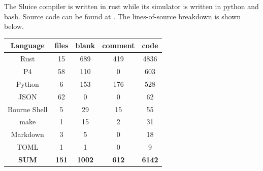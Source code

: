 \documentclass[12pt, oneside]{article}
\begin{document}
The Sluice compiler is written in rust while its simulator is written in python and bash. Source code can be found at \cite{sluiceSrc}. The lines-of-source breakdown is shown below.

\begin{center}
 \begin{tabular} {|c c c c c|} 
 \hline
 Language &  files & blank & comment & code  \\ [0.5ex] 
  \hline\hline
Rust &	15  & 689 & 419 &  4836\\
 \hline\hline
P4&	58 & 110 & 0 & 603 \\
 \hline
Python& 6 & 153 & 176 & 528 \\
 \hline
JSON&	62 & 0 & 0 & 62 \\
 \hline
Bourne Shell&	5 & 29 & 15 & 55 \\
 \hline
make & 1 & 15 & 2 & 31 \\
 \hline
Markdown & 3 & 5 & 0 & 18 \\
 \hline
TOML & 1 & 1 & 0 & 9 \\
 \hline
 \textbf{SUM} & \textbf{151} & \textbf{1002} & \textbf{612} & \textbf{6142} \\
 \hline
\end{tabular}
\end{center}


\newpage


\end{document}
